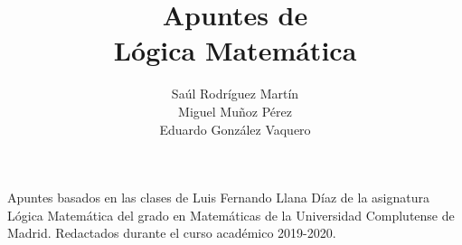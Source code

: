 \documentclass{report}
\theoremstyle{definition}
\theoremstyle{remark}
\numberwithin{section}{chapter}
\numberwithin{equation}{chapter}
\begin{document}
\frontmatter

\title{Apuntes de\\ Lógica Matemática}


\author{Saúl Rodríguez Martín\\ Miguel Muñoz Pérez \\ Eduardo González Vaquero}

\maketitle




\cleardoublepage
\vspace*{13.5pc}
\begin{center}
  Apuntes basados en las clases de Luis Fernando Llana Díaz de la asignatura Lógica Matemática del grado en Matemáticas de la Universidad Complutense de Madrid. Redactados durante el curso académico 2019-2020.
\end{center}
\cleardoublepage


\tableofcontents
{}



\mainmatter



\appendix

\backmatter

\printindex
\end{document}
